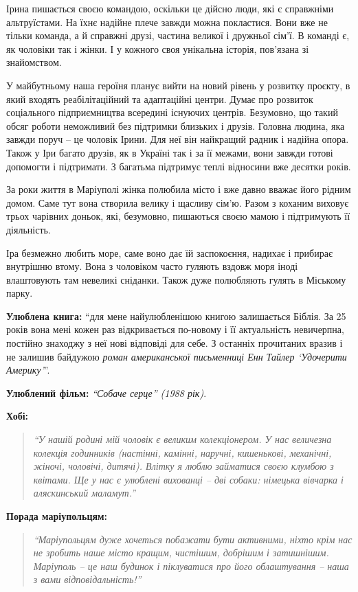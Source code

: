 Ірина пишається своєю командою, оскільки це дійсно люди, які є справжніми
альтруїстами. На їхнє надійне плече завжди можна покластися. Вони вже не тільки
команда, а й справжні друзі, частина великої і дружньої сім’ї. В команді є, як
чоловіки так і жінки. І у кожного своя унікальна історія, пов’язана зі
знайомством.

У майбутньому наша героїня планує вийти на новий рівень у розвитку проєкту, в
який входять реабілітаційний та адаптаційні центри. Думає про розвиток
соціального підприємництва всередині існуючих центрів. Безумовно, що такий
обсяг роботи неможливий без підтримки близьких і друзів. Головна людина, яка
завжди поруч – це чоловік Ірини. Для неї він найкращий радник і надійна опора.
Також у Іри багато друзів, як в Україні так і за її межами, вони завжди готові
допомогти і підтримати. З багатьма підтримує теплі відносини вже десятки років.

За роки життя в Маріуполі жінка полюбила місто і вже давно вважає його рідним
домом. Саме тут вона створила велику і щасливу сім’ю. Разом з коханим виховує
трьох чарівних доньок, які, безумовно, пишаються своєю мамою і підтримують її
діяльність.


Іра безмежно любить море, саме воно дає їй заспокоєння, надихає і прибирає
внутрішню втому. Вона з чоловіком часто гуляють вздовж моря іноді влаштовують
там невеликі сніданки. Також дуже полюбляють гулять в Міському парку.

\textbf{Улюблена книга:} \enquote{для мене найулюбленішою книгою залишається Біблія. За 25
років вона мені кожен раз відкривається по-новому і її актуальність невичерпна,
постійно знаходжу з неї нові відповіді для себе. З останніх прочитаних вразив і
не залишив байдужою \emph{роман американської письменниці  Енн Тайлер \enquote{Удочерити
Америку}}}.

\textbf{Улюблений фільм:} \emph{\enquote{Собаче серце} (1988 рік)}.

\textbf{Хобі:} 

\begin{quote}
\em\enquote{У нашій родині мій чоловік є великим колекціонером. У нас величезна
колекція годинників (настінні, камінні, наручні, кишенькові, механічні, жіночі,
чоловічі, дитячі). Влітку я люблю займатися своєю клумбою з квітами. Ще у нас є
улюблені вихованці – дві собаки: німецька вівчарка і аляскинський маламут.}
\end{quote}

\textbf{Порада маріупольцям:} 

\begin{quote}
\em\enquote{Маріупольцям дуже хочеться побажати бути активними, ніхто
крім нас не зробить наше місто кращим, чистішим, добрішим і затишнішим.
Маріуполь – це наш будинок і піклуватися про його облаштування – наша з вами
відповідальність!}
\end{quote}
